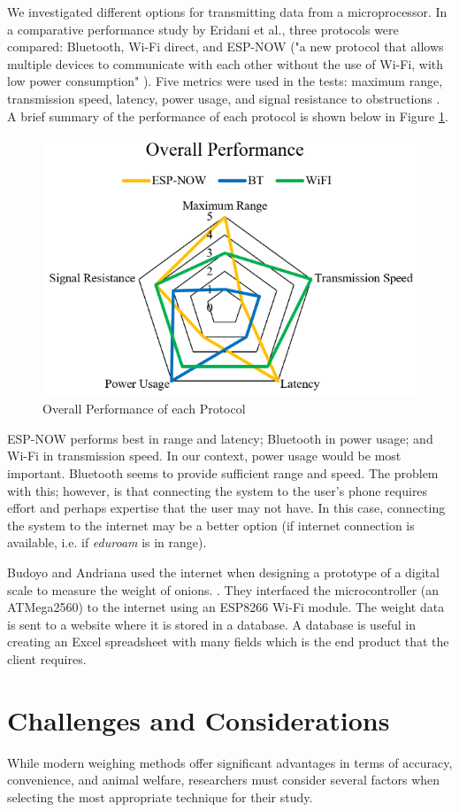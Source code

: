 \documentclass[class=report,11pt,crop=false]{standalone}
\begin{document}
We investigated different options for transmitting data from a microprocessor. In a comparative performance study by Eridani et al., three protocols were compared: Bluetooth, Wi-Fi direct, and ESP-NOW ("a new protocol that allows multiple devices to communicate with each other without the use of Wi-Fi, with low power consumption" \cite{comparitiveEspnow}). Five metrics were used in the tests: maximum range, transmission speed, latency, power usage, and signal resistance to obstructions \cite{comparitiveEspnow}. A brief summary of the performance of each protocol is shown below in Figure \ref{fig:performance}.
\begin{figure}[h]
	\centering
	\includegraphics[width=0.7\linewidth]{Figures/performance}
	\caption{Overall Performance of each Protocol \cite{comparitiveEspnow}}
	\label{fig:performance}
\end{figure}

ESP-NOW performs best in range and latency; Bluetooth in power usage; and Wi-Fi in transmission speed. In our context, power usage would be most important. Bluetooth seems to provide sufficient range and speed.
The problem with this; however, is that connecting the system to the user's phone requires effort and perhaps expertise that the user may not have. In this case, connecting the system to the internet may be a better option (if internet connection is available, i.e. if \textit{eduroam} is in range). 

Budoyo and Andriana used the internet when designing a prototype of a digital scale to measure the weight of onions. \cite{iot}. They interfaced the microcontroller (an  ATMega2560) to the internet using an ESP8266 Wi-Fi module. The weight data is sent to a website where it is stored in a database. A database is useful in creating an Excel spreadsheet with many fields which is the end product that the client requires.


\section{Challenges and Considerations}
While modern weighing methods offer significant advantages in terms of accuracy, convenience, and animal welfare, researchers must consider several factors when selecting the most appropriate technique for their study.
\end{document}
